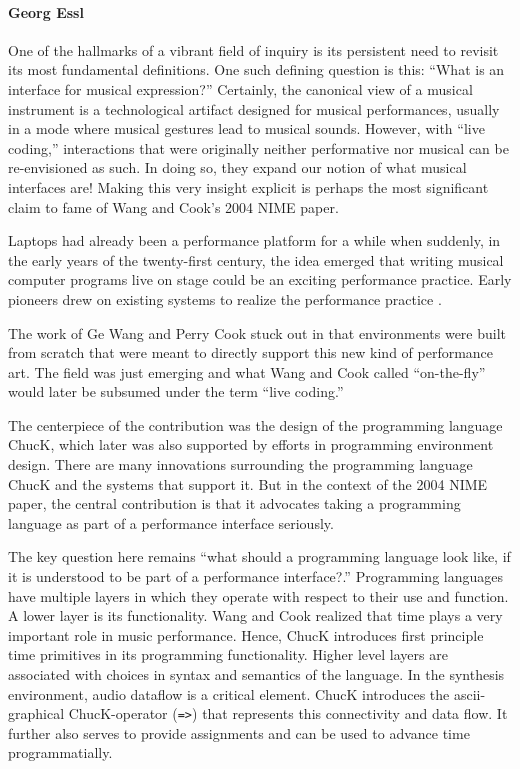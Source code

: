 \paragraph{Georg Essl}

One of the hallmarks of a vibrant field of inquiry is its persistent need to revisit its most fundamental definitions. One such defining question is this: ``What is an interface for musical expression?'' Certainly, the canonical view of a musical instrument is a technological artifact designed for musical performances, usually in a mode where musical gestures lead to musical sounds. However, with ``live coding,'' interactions that were originally neither performative nor musical can be re-envisioned as such. In doing so, they expand our notion of what musical interfaces are! Making this very insight explicit is perhaps the most significant claim to fame of Wang and Cook's 2004 NIME paper.

Laptops had already been a performance platform for a while when suddenly, in the early years of the twenty-first century, the idea emerged that writing musical computer programs live on stage could be an exciting performance practice.  Early pioneers drew on existing systems to realize the performance practice \cite{Collins:2003}.

The work of Ge Wang and Perry Cook stuck out in that environments were built from scratch that were meant to directly support this new kind of performance art. The field was just emerging and what Wang and Cook called ``on-the-fly'' would later be subsumed under the term ``live coding.'' 

The centerpiece of the contribution was the design of the programming language ChucK, which later was also supported by efforts in programming environment design. There are many innovations surrounding the programming language ChucK and the systems that support it. But in the context of the 2004 NIME paper, the central contribution is that it advocates taking a programming language as part of a performance interface seriously.

The key question here remains ``what should a programming language look like, if it is understood to be part of a performance interface?.'' Programming languages have multiple layers in which they operate with respect to their use and function. A lower layer is its functionality. Wang and Cook realized that time plays a very important role in music performance. Hence, ChucK introduces first principle time primitives in its programming functionality. Higher level layers are associated with choices in syntax and semantics of the language. In the synthesis environment, audio dataflow is a critical element. ChucK introduces the ascii-graphical ChucK-operator (\verb!=>!) that represents this connectivity and data flow. It further also serves to provide assignments and can be used to advance time programmatially.

